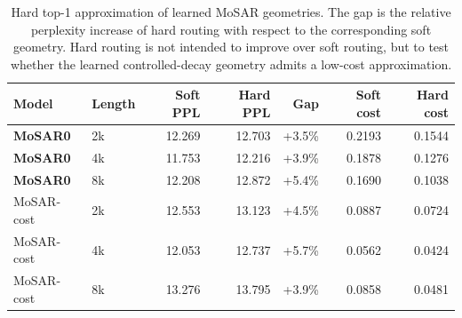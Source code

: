 \begin{table}[t]
\centering
\small
\setlength{\tabcolsep}{3.2pt}
\begin{tabular}{llrrrrr}
\toprule
Model & Length & Soft PPL & Hard PPL & Gap & Soft cost & Hard cost \\
\midrule
\textbf{MoSAR0} & 2k & 12.269 & 12.703 & +3.5\% & 0.2193 & 0.1544 \\
\textbf{MoSAR0} & 4k & 11.753 & 12.216 & +3.9\% & 0.1878 & 0.1276 \\
\textbf{MoSAR0} & 8k & 12.208 & 12.872 & +5.4\% & 0.1690 & 0.1038 \\
\midrule
MoSAR-cost & 2k & 12.553 & 13.123 & +4.5\% & 0.0887 & 0.0724 \\
MoSAR-cost & 4k & 12.053 & 12.737 & +5.7\% & 0.0562 & 0.0424 \\
MoSAR-cost & 8k & 13.276 & 13.795 & +3.9\% & 0.0858 & 0.0481 \\
\bottomrule
\end{tabular}
\caption{
Hard top-1 approximation of learned MoSAR geometries. 
The gap is the relative perplexity increase of hard routing with respect to the corresponding soft geometry. 
Hard routing is not intended to improve over soft routing, but to test whether the learned controlled-decay geometry admits a low-cost approximation.
}
\label{tab:hard-approximation}
\end{table}
